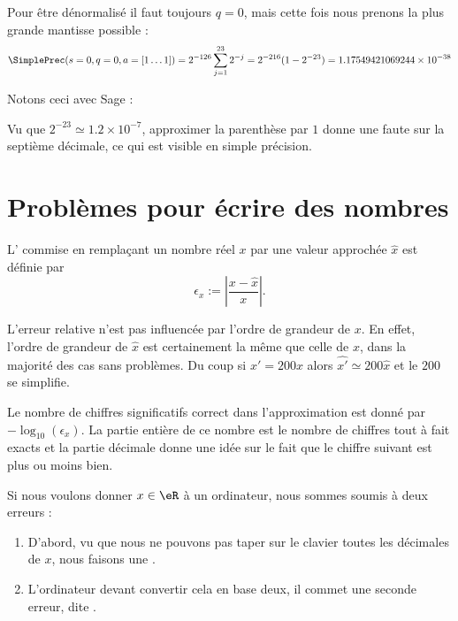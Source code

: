 \begin{example}      \label{EXEMooRHENooGwumoA}
	Pour être dénormalisé il faut toujours \( q=0\), mais cette fois nous prenons la plus grande mantisse possible :
	\begin{equation}
		\SimplePrec(s=0,q=0,a=[1\ldots 1])=2^{-126}\sum_{j=1}^{23}2^{-j}=2^{-216}(1-2^{-23})= 1.17549421069244\times 10^{-38}
	\end{equation}
\end{example}

Notons ceci avec Sage :


Vu que \( 2^{-23}\simeq 1.2\times 10^{-7}\), approximer la parenthèse par \( 1\) donne une faute sur la septième décimale, ce qui est visible en simple précision.

\section{Problèmes pour écrire des nombres}

\begin{definition}
	L' commise en remplaçant un nombre réel \( x\) par une valeur approchée \( \hat{x}\) est définie par
	\begin{equation}
		\epsilon_x:=\left|\frac{x-\hat{x}}{x}\right|.
	\end{equation}
\end{definition}

L'erreur relative n'est pas influencée par l'ordre de grandeur de \( x\). En effet, l'ordre de grandeur de \( \hat x\) est certainement la même que celle de \( x\), dans la majorité des cas sans problèmes. Du coup si \( x'=200x\) alors \( \hat{x'}\simeq 200\hat{x}\) et le \( 200\) se simplifie.

Le nombre de chiffres significatifs correct dans l'approximation est donné par \( -\log_{10}(\epsilon_x)\). La partie entière de ce nombre est le nombre de chiffres tout à fait exacts et la partie décimale donne une idée sur le fait que le chiffre suivant est plus ou moins bien.


\begin{remark}
	Si nous voulons donner \( x\in \eR\) à un ordinateur, nous sommes soumis à deux erreurs :
	\begin{enumerate}
		\item
		      D'abord, vu que nous ne pouvons pas taper sur le clavier toutes les décimales de \( x\), nous faisons une .
		\item
		      L'ordinateur devant convertir cela en base deux, il commet une seconde erreur, dite .
	\end{enumerate}
\end{remark}

